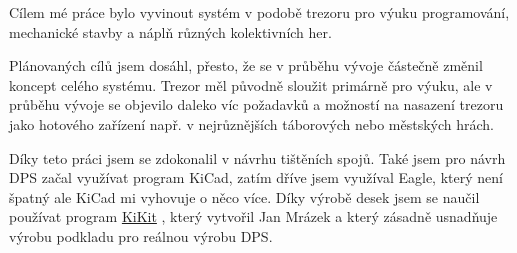Cílem mé práce bylo vyvinout systém v podobě trezoru pro výuku programování, mechanické stavby a náplň různých kolektivních her. 

Plánovaných cílů jsem dosáhl, přesto, že se v průběhu vývoje částečně změnil koncept celého systému. Trezor měl původně sloužit primárně pro výuku, ale v průběhu vývoje 
se objevilo daleko víc požadavků a možností na nasazení trezoru jako hotového zařízení např. v nejrůznějších táborových nebo městských hrách. 



Díky teto práci jsem se zdokonalil v návrhu tištěních spojů. Také jsem pro návrh DPS začal využívat program KiCad, zatím dříve jsem využíval Eagle, který není špatný ale KiCad 
mi vyhovuje o něco více. Díky výrobě desek jsem se naučil používat program \href{https://github.com/yaqwsx/KiKit}{KiKit} \parencite{KiKit}, 
který vytvořil Jan Mrázek a který zásadně usnadňuje výrobu podkladu pro reálnou výrobu DPS.



